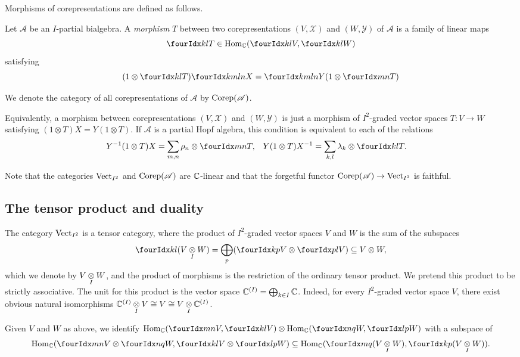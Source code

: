 Morphisms of corepresentations are defined as follows.
\begin{Def}
  Let $\mathscr{A}$ be an $I$-partial bialgebra.  A \emph{morphism}
  $T$ between two corepresentations $(V,\mathscr{X})$ and $(W,\mathscr{Y})$ of
  $\mathscr{A}$ is a family of linear maps
  \[\Gru{T}{k}{l} \in
  \Hom_\C(\Gru{V}{k}{l},\Gru{W}{k}{l})\] satisfying \[(1 \otimes
  \Gru{T}{k}{l})\Gr{X}{k}{l}{m}{n} = \Gr{Y}{k}{l}{m}{n}(1 \otimes
  \Gru{T}{m}{n})\]
\end{Def}
We denote the category of all corepresentations of $\mathscr{A}$ by
$\mathrm{Corep}(\mathscr{A})$.
\begin{Rem} \label{remark:corep-total-morphism}
 Equivalently, a morphism between corepresentations
    $(V,\mathscr{X})$ and $(W,\mathscr{Y})$ is just a morphism of
    $I^{2}$-graded vector spaces $T\colon V\to W$ satisfying
    $(1\otimes T) X= Y(1 \otimes T)$. If $\mathscr{A}$ is  a
    partial Hopf algebra, this condition is equivalent to each of the relations
    \begin{align*}
      Y^{-1}(1 \otimes T)X&=\sum_{m,n} \rho_{n} \otimes \Gru{T}{m}{n},
      &
    Y(1\otimes T)X^{-1} &=\sum_{k,l} \lambda_{k} \otimes \Gru{T}{k}{l}.
    \end{align*}
\end{Rem}

Note that the categories $\mathrm{Vect}_{I^{2}}$ and $\mathrm{Corep}(\mathscr{A})$ are
$\mathbb{C}$-linear and that the forgetful functor $\mathrm{Corep}(\mathscr{A})\to
\mathrm{Vect}_{I^{2}}$ is faithful. 

\subsection{The tensor product and duality}
The category $\mathrm{Vect}_{I^{2}}$ is a tensor category, where
the product of $I^{2}$-graded vector spaces $V$ and $W$ is the sum of
the subspaces
\begin{align*}
 \Gru{(V\itimes W)}{k}{l} =
  \bigoplus_{p} (\Gru{V}{k}{p}\otimes \Gru{V}{p}{l}) \subseteq
  V\otimes W,
\end{align*}
which we denote by $V \underset{I}{\otimes} W$, and the product of morphisms is the
restriction of the ordinary tensor product.  We pretend this product
to be strictly associative.  The unit for this product is the vector
space $\mathbb{C}^{(I)}=\bigoplus_{k\in I} \mathbb{C}$. Indeed, for every
$I^{2}$-graded vector space $V$, there exist obvious natural
isomorphisms $\mathbb{C}^{(I)} \underset{I}{\otimes} V \cong V \cong V \underset{I}{\otimes} \mathbb{C}^{(I)}$.

Given $V$ and $W$ as above, we identify $\Hom_\C(\Gru{V}{m}{n},\Gru{V}{k}{l})\otimes
   \Hom_\C(\Gru{W}{n}{q},\Gru{W}{l}{p})$ with a subspace of
\begin{align*}
   \Hom_\C(\Gru{V}{m}{n}\otimes
   \Gru{W}{n}{q},\Gru{V}{k}{l}\otimes \Gru{W}{l}{p})\subseteq
   \Hom_\C(\Gru{(V\itimes
     W)}{m}{q},\Gru{(V\itimes W)}{k}{p}).
\end{align*}


